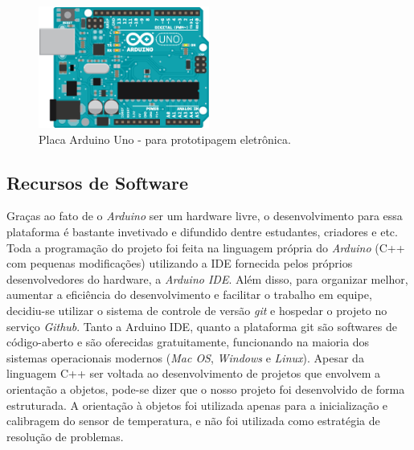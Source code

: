 \documentclass[a4paper,12pt]{article}
\begin{document}
\begin{figure}[!ht]
	\centering
		\includegraphics[width=0.5\textwidth]{illu-arduino-UNO.png}
		\caption{Placa Arduino Uno - para prototipagem eletrônica.}
\end{figure}


\subsection{Recursos de Software}

Graças ao fato de o \textit{Arduino} ser um hardware livre, o desenvolvimento para essa plataforma é bastante invetivado e difundido dentre estudantes, criadores e etc. Toda a programação do projeto foi feita na linguagem própria do \textit{Arduino} (C++ com pequenas modificações) utilizando a IDE fornecida pelos próprios desenvolvedores do hardware, a \textit{Arduino IDE}. Além disso, para organizar melhor, aumentar a eficiência do desenvolvimento e facilitar o trabalho em equipe, decidiu-se utilizar o sistema de controle de versão \textit{git} e hospedar o projeto no serviço \textit{Github}. Tanto a Arduino IDE, quanto a plataforma git são softwares de código-aberto e são oferecidas gratuitamente, funcionando na maioria dos sistemas operacionais modernos (\textit{Mac OS}, \textit{Windows} e \textit{Linux}).
    Apesar da linguagem C++ ser voltada ao desenvolvimento de projetos que envolvem a orientação a objetos, pode-se dizer que o nosso projeto foi desenvolvido de forma estruturada. A orientação à objetos foi utilizada apenas para a inicialização e calibragem do sensor de temperatura, e não foi utilizada como estratégia de resolução de problemas.
\end{document}

